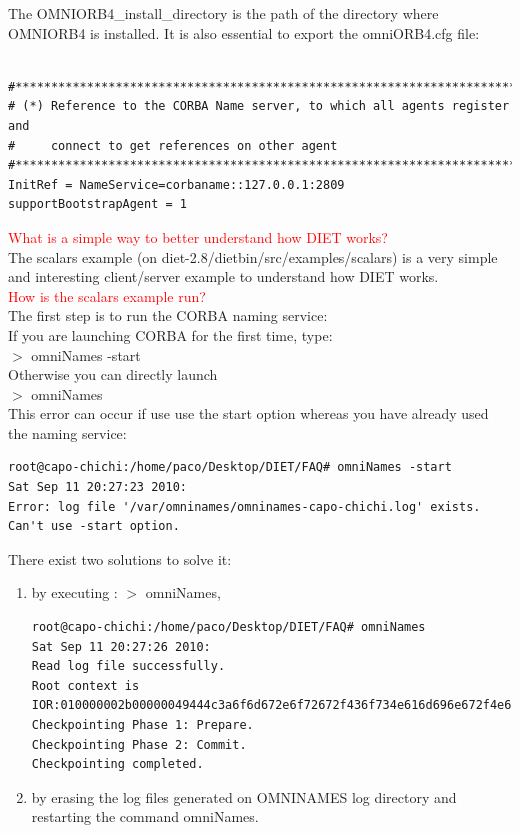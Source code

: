 \documentclass[12pt,a4paper]{book}
\newcommand{\dietversion}{2.8}
\begin{document}
\noindent The OMNIORB4\_install\_directory is the path of the directory where OMNIORB4 is installed. It is also essential to export the omniORB4.cfg file:\\


\begin{verbatim}

#****************************************************************************#
# (*) Reference to the CORBA Name server, to which all agents register and
#     connect to get references on other agent
#****************************************************************************#
InitRef = NameService=corbaname::127.0.0.1:2809
supportBootstrapAgent = 1
\end{verbatim}

\noindent \textcolor{red}{What is a simple way to better understand how DIET works?}\\
The scalars example (on diet-\dietversion/dietbin/src/examples/scalars) is a very simple and interesting client/server example to understand how DIET works.\\

\noindent \textcolor{red}{How is the scalars example run?}\\
The first step is to run the CORBA naming service:\\
If you are launching CORBA for the first time, type:\\
$>$ omniNames -start\\
Otherwise you can directly launch\\
$>$ omniNames\\

\noindent This error can occur if use use the start option whereas you have already used the naming service:
\begin{verbatim}
root@capo-chichi:/home/paco/Desktop/DIET/FAQ# omniNames -start
Sat Sep 11 20:27:23 2010:
Error: log file '/var/omninames/omninames-capo-chichi.log' exists.  Can't use -start option.
\end{verbatim}

\noindent There exist two solutions to solve it:
\begin{enumerate}
 \item by executing : $>$ omniNames,

\begin{verbatim}
root@capo-chichi:/home/paco/Desktop/DIET/FAQ# omniNames
Sat Sep 11 20:27:26 2010:
Read log file successfully.
Root context is IOR:010000002b00000049444c3a6f6d672e6f72672f436f734e616d696e672f4e616d696e67436f6e746578744578743a312e300000010000000000000070000000010102000e0000003139322e3136382e312e31303400f90a0b0000004e616d6553657276696365000300000000000000080000000100000000545441010000001c000000010000000100010001000000010001050901010001000000090101000354544108000000ccf6844c010037fa
Checkpointing Phase 1: Prepare.
Checkpointing Phase 2: Commit.
Checkpointing completed.
\end{verbatim}

 \item by erasing the log files generated on OMNINAMES log directory and restarting the command omniNames.
\end{enumerate}
\end{document}
